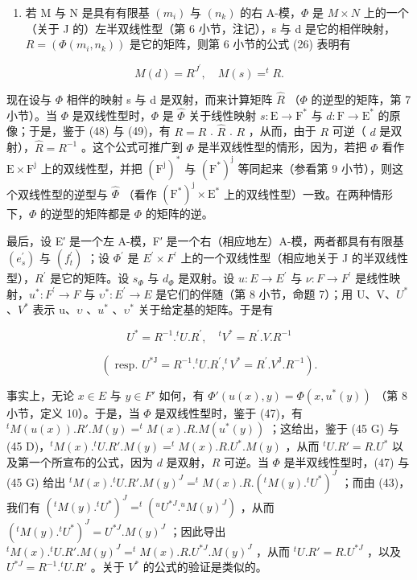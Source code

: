 \begin{enumerate}
\def\labelenumi{\arabic{enumi})}
\setcounter{enumi}{1}
\tightlist
\item
  若 M 与 N 是具有有限基 \((m_{i})\) 与 \((n_{k})\) 的右 A-模，\(\Phi\) 是 \(M \times N\) 上的一个（关于 J 的）左半双线性型（第 6 小节，注记），s 与 d 是它的相伴映射，\(R = (\Phi(m_{i}, n_{k}))\) 是它的矩阵，则第 6 小节的公式 (26) 表明有
\end{enumerate}

\[
M (d) = R ^ {J ^ {\prime}}, \quad M (s) = ^ {t} R.
\]

现在设与 \(\Phi\) 相伴的映射 s 与 d 是双射，而来计算矩阵 \(\hat{R}\) （\(\Phi\) 的逆型的矩阵，第 7 小节）。当 \(\Phi\) 是双线性型时，\(\Phi\) 是 \(\hat{\Phi}\) 关于线性映射 \(s: \mathrm{E} \to \mathrm{F}^*\) 与 \(d: \mathrm{F} \to \mathrm{E}^*\) 的原像；于是，鉴于 (48) 与 (49)，有 \(R = R\) . \(\hat{R}\) . \(R\) ，从而，由于 \(R\) 可逆（ \(d\) 是双射），\(\hat{R} = R^{-1}\) 。这个公式可推广到 \(\Phi\) 是半双线性型的情形，因为，若把 \(\Phi\) 看作 \(\mathrm{E} \times \mathrm{F}^{\mathrm{j}}\) 上的双线性型，并把 \((\mathrm{F}^{\mathrm{j}})^{*}\) 与 \((\mathrm{F}^{*})^{\mathrm{j}}\) 等同起来（参看第 9 小节），则这个双线性型的逆型与 \(\hat{\Phi}\) （看作 \((\mathrm{F}^{*})^{\mathrm{j}} \times \mathrm{E}^{*}\) 上的双线性型）一致。在两种情形下，\(\Phi\) 的逆型的矩阵都是 \(\Phi\) 的矩阵的逆。

最后，设 E′ 是一个左 A-模，F′ 是一个右（相应地左）A-模，两者都具有有限基 \((e_{s}^{\prime})\) 与 \((f_{t}^{\prime})\) ；设 \(\Phi^{\prime}\) 是 \(E^{\prime} \times F^{\prime}\) 上的一个双线性型（相应地关于 J 的半双线性型），\(R^{\prime}\) 是它的矩阵。设 \(s_{\Phi}\) 与 \(d_{\Phi}\) 是双射。设 \(u : E \to E^{\prime}\) 与 \(\nu : F \to F^{\prime}\) 是线性映射，\(u^{*} : F^{\prime} \to F\) 与 \(\upsilon^{*} : E^{\prime} \to E\) 是它们的伴随（第 8 小节，命题 7）；用 U、V、\(U^{*}\) 、\(V^{*}\) 表示 u、\(\upsilon\) 、\(u^{*}\) 、\(\upsilon^{*}\) 关于给定基的矩阵。于是有

\[
U ^ {*} = R ^ {- 1}. ^ {t} U. R ^ {\prime}, \quad {} ^ {t} V ^ {*} = R ^ {\prime}. V. R ^ {- 1}\tag{50}
\]

\[
(\text { resp. } U ^ {* \mathrm{J}} = R ^ {- 1}. ^ {t} U. R ^ {\prime}, ^ {t} V ^ {*} = R ^ {\prime}. V ^ {\mathrm{J}}. R ^ {- 1}).
\]

事实上，无论 \(x \in E\) 与 \(y \in F'\) 如何，有 \(\Phi'(u(x), y) = \Phi(x, u^*(y))\) （第 8 小节，定义 10）。于是，当 \(\Phi\) 是双线性型时，鉴于 (47)，有 \(^t M(u(x)). R'. M(y) = ^t M(x). R. M(u^*(y))\) ；这给出，鉴于 (45 G) 与 (45 D)，\(^t M(x). ^t U. R'. M(y) = ^t M(x). R. U^*. M(y)\) ，从而 \(^t U. R' = R. U^*\) 以及第一个所宣布的公式，因为 \(d\) 是双射，\(R\) 可逆。当 \(\Phi\) 是半双线性型时，(47) 与 (45 G) 给出 \(^t M(x). ^t U. R'. M(y)^J = ^t M(x). R. (^{t}M(y). ^{t}U^*)^{J}\) ；而由 (43)，我们有 \((^{t}M(y). ^{t}U^*)^{J} = ^{t}(^{u}U^{*J}. ^{u}M(y)^{J})\) ，从而 \((^{t}M(y). ^{t}U^*)^{J} = U^{*J}. M(y)^{J}\) ；因此导出 \(^t M(x). ^{t}U. R'. M(y)^{J} = ^{t}M(x). R. U^{*J}. M(y)^{J}\) ，从而 \(^t U. R' = R. U^{*J}\) ，以及 \(U^{*J} = R^{-1}. ^{t}U. R'\) 。关于 \(V^*\) 的公式的验证是类似的。

